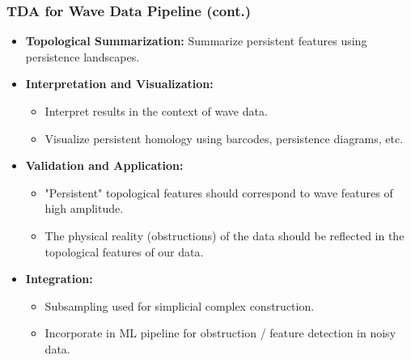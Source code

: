 \documentclass{beamer}
\begin{document}
\begin{frame}
  \frametitle{TDA for Wave Data Pipeline (cont.)}

  \begin{itemize}
    \setlength\itemsep{1em} %
    \item \textbf{Topological Summarization:} Summarize persistent features using persistence landscapes.
    \item \textbf{Interpretation and Visualization:}
      \begin{itemize}
        \setlength\itemsep{0.5em} %
        \item Interpret results in the context of wave data.
        \item Visualize persistent homology using barcodes, persistence diagrams, etc.
      \end{itemize}
    \item \textbf{Validation and Application:}
      \begin{itemize}
        \setlength\itemsep{0.5em} %
        \item "Persistent" topological features should correspond to wave features of high amplitude.
        \item The physical reality (obstructions) of the data should be reflected in the topological features of our data.
      \end{itemize}
    \item \textbf{Integration:}
      \begin{itemize}
        \setlength\itemsep{0.5em} %
        \item Subsampling used for simplicial complex construction.
        \item Incorporate in ML pipeline for obstruction / feature detection in noisy data.
      \end{itemize}
  \end{itemize}
\end{frame}
\end{document}
